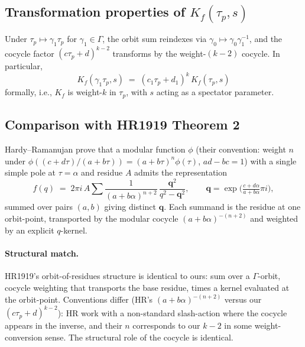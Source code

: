 \documentclass[11pt]{article}
\begin{document}
\subsection{Transformation properties of $K_f(\tau_p, s)$}

Under $\tau_p \mapsto \gamma_1\tau_p$ for $\gamma_1 \in \Gamma$, the
orbit sum reindexes via $\gamma_0 \mapsto \gamma_0\gamma_1^{-1}$, and
the cocycle factor $(c\tau_p + d)^{k - 2}$ transforms by the
weight-$(k-2)$ cocycle.  In particular,
\begin{equation}\label{eq:Kf-weight-k}
  K_f(\gamma_1\tau_p, s)
  \;=\; (c_1\tau_p + d_1)^k\,K_f(\tau_p, s)
\end{equation}
formally, i.e., $K_f$ is weight-$k$ in $\tau_p$, with $s$ acting as a
spectator parameter.

\subsection{Comparison with HR1919 Theorem 2}

Hardy--Ramanujan \cite[Thm.~2]{HR1919} prove that a modular function
$\phi$ (their convention: weight $n$ under
$\phi((c + d\tau)/(a + b\tau)) = (a + b\tau)^n\phi(\tau)$,
$ad - bc = 1$) with a single simple pole at $\tau = \alpha$ and
residue $A$ admits the representation
\begin{equation}\label{eq:HR-thm2}
  f(q) \;=\; 2\pi i\,A\!\sum\!\frac{1}{(a + b\alpha)^{n + 2}}\,
  \frac{\mathbf{q}^2}{q^2 - \mathbf{q}^2},
  \qquad
  \mathbf{q} = \exp\!\bigl(\tfrac{c + d\alpha}{a + b\alpha}\pi i\bigr),
\end{equation}
summed over pairs $(a, b)$ giving distinct $\mathbf{q}$.  Each summand
is the residue at one orbit-point, transported by the modular cocycle
$(a + b\alpha)^{-(n+2)}$ and weighted by an explicit $q$-kernel.

\paragraph{Structural match.}
HR1919's orbit-of-residues structure is identical to ours: sum over a
$\Gamma$-orbit, cocycle weighting that transports the base residue,
times a kernel evaluated at the orbit-point.  Conventions differ
(HR's $(a + b\alpha)^{-(n+2)}$ versus our $(c\tau_p + d)^{k - 2}$):
HR work with a non-standard slash-action where the cocycle appears in
the inverse, and their $n$ corresponds to our $k - 2$ in some
weight-conversion sense.  The structural role of the cocycle is
identical.
\end{document}
